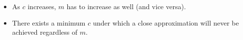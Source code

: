 \documentclass[]{interact}
\theoremstyle{plain}%
\theoremstyle{definition}
\theoremstyle{remark}
\begin{document}
\begin{itemize}
\item As $c$ increases, $m$ has to increase as well (and vice versa).
\item There exists a minimum $c$ under which a close approximation will never be achieved regardless of $m$.
\end{itemize}

\begin{figure}
\centering
{}\\
\vspace{-1mm}

\end{figure}
\end{document}
